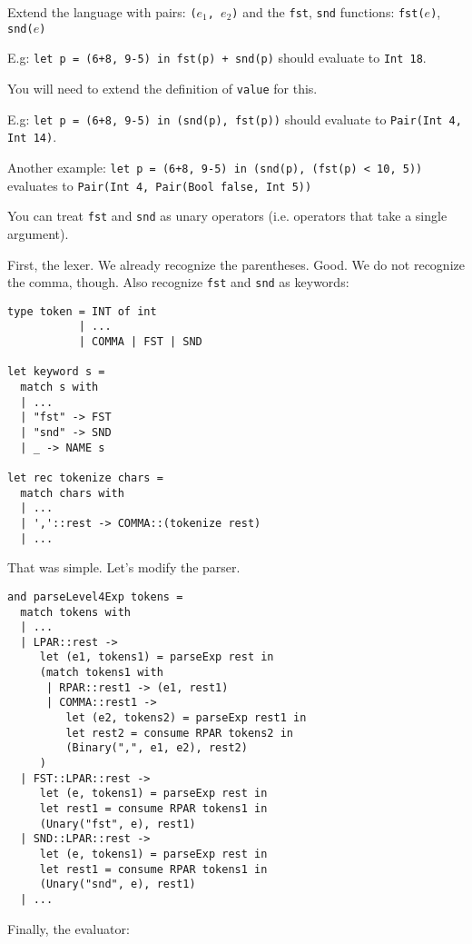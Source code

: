 \documentclass[addpoints]{exam}
\begin{document}
\begin{questions}
  \question
  Extend the language with pairs: \texttt{($e_1$, $e_2$)}
  and the \texttt{fst}, \texttt{snd}
  functions: \texttt{fst($e$)}, \texttt{snd($e$)} 

  E.g: \texttt{let p = (6+8, 9-5) in fst(p) + snd(p)}
  should evaluate to \texttt{Int 18}.

  You will need to extend the definition of \texttt{value} for this.

  E.g: \texttt{let p = (6+8, 9-5) in (snd(p), fst(p))}
  should evaluate to \texttt{Pair(Int 4, Int 14)}.

  Another example:
  \texttt{let p = (6+8, 9-5) in (snd(p), (fst(p) < 10, 5))}
  evaluates to \texttt{Pair(Int 4, Pair(Bool false, Int 5))}

  You can treat \texttt{fst} and \texttt{snd} as unary operators
  (i.e. operators that take a single argument).
  
  \begin{solution}
    First, the lexer.
    We already recognize the parentheses. Good.
    We do not recognize the comma, though.
    Also recognize \texttt{fst} and \texttt{snd} as keywords:

    \begin{verbatim}
type token = INT of int
           | ...
           | COMMA | FST | SND

let keyword s =
  match s with
  | ...
  | "fst" -> FST
  | "snd" -> SND
  | _ -> NAME s
  
let rec tokenize chars =
  match chars with
  | ...
  | ','::rest -> COMMA::(tokenize rest)
  | ...
    \end{verbatim}

    That was simple.
    Let's modify the parser.

    \begin{verbatim}
and parseLevel4Exp tokens =
  match tokens with
  | ...
  | LPAR::rest ->
     let (e1, tokens1) = parseExp rest in
     (match tokens1 with
      | RPAR::rest1 -> (e1, rest1)
      | COMMA::rest1 ->
         let (e2, tokens2) = parseExp rest1 in
         let rest2 = consume RPAR tokens2 in
         (Binary(",", e1, e2), rest2)
     )
  | FST::LPAR::rest ->
     let (e, tokens1) = parseExp rest in
     let rest1 = consume RPAR tokens1 in
     (Unary("fst", e), rest1)     
  | SND::LPAR::rest ->
     let (e, tokens1) = parseExp rest in
     let rest1 = consume RPAR tokens1 in
     (Unary("snd", e), rest1)     
  | ...
    \end{verbatim}

    Finally, the evaluator:


\end{solution}
\end{questions}
\end{document}
